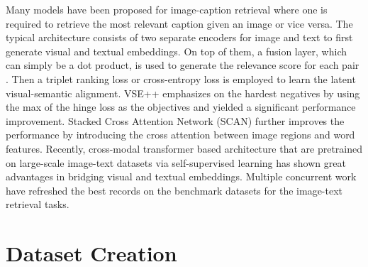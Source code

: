 \documentclass[11pt,a4paper]{article}
\begin{document}
Many models have been proposed for image-caption retrieval where one is required to retrieve the most relevant caption given an image or vice versa. The typical architecture consists of two separate encoders for image and text to first generate visual and textual embeddings. On top of them, a fusion layer, which can simply be a dot product, is used to generate the relevance score for each pair \cite{NIPS2013_5204, kiros2014unifying, parekh2020crisscrossed, karpathy2015deep, faghri2018vse++}. Then a triplet ranking loss or cross-entropy loss is employed to learn the latent visual-semantic alignment. VSE++ \cite{faghri2018vse++} emphasizes on the hardest negatives by using the max of the hinge loss as the objectives and yielded a significant performance improvement. Stacked Cross Attention Network (SCAN) \cite{lee2018stacked} further improves the performance by introducing the cross attention between image regions and word features. Recently, cross-modal transformer based architecture that are pretrained on large-scale image-text datasets via self-supervised learning has shown great advantages in bridging visual and textual embeddings. Multiple concurrent work \cite{lu2019vilbert, chen2020uniter, li2019unicodervl} have refreshed the best records on the benchmark datasets for the image-text retrieval tasks.

\section{Dataset Creation}
\end{document}
